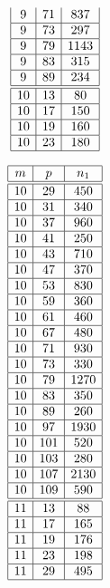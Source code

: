 \documentclass[a4paper, 10pt]{article}
\begin{document}
\begin{center}
\begin{minipage}[t]{.23\textwidth}
\begin{displaymath}
\begin{array}{|c|c|c|}
9 & 71 & 837 \\ \hline
9 & 73 & 297 \\ \hline
9 & 79 & 1143 \\ \hline
9 & 83 & 315 \\ \hline
9 & 89 & 234 \\ \hline
\hline
10 & 13 & 80 \\ \hline
10 & 17 & 150 \\ \hline
10 & 19 & 160 \\ \hline
10 & 23 & 180 \\ \hline
\end{array}
\end{displaymath}
\end{minipage}
\begin{minipage}[t]{.23\textwidth}
\begin{displaymath}
\begin{array}{|c|c|c|}
\hline
m & p & n_{1} \\ \hline
\hline
10 & 29 & 450 \\ \hline
10 & 31 & 340 \\ \hline
10 & 37 & 960 \\ \hline
10 & 41 & 250 \\ \hline
10 & 43 & 710 \\ \hline
10 & 47 & 370 \\ \hline
10 & 53 & 830 \\ \hline
10 & 59 & 360 \\ \hline
10 & 61 & 460 \\ \hline
10 & 67 & 480 \\ \hline
10 & 71 & 930 \\ \hline
10 & 73 & 330 \\ \hline
10 & 79 & 1270 \\ \hline
10 & 83 & 350 \\ \hline
10 & 89 & 260 \\ \hline
10 & 97 & 1930 \\ \hline
10 & 101 & 520 \\ \hline
10 & 103 & 280 \\ \hline
10 & 107 & 2130 \\ \hline
10 & 109 & 590 \\ \hline
\hline
11 & 13 & 88 \\ \hline
11 & 17 & 165 \\ \hline
11 & 19 & 176 \\ \hline
11 & 23 & 198 \\ \hline
11 & 29 & 495 \\ \hline

\end{array}
\end{displaymath}
\end{minipage}
\end{center}
\end{document}
